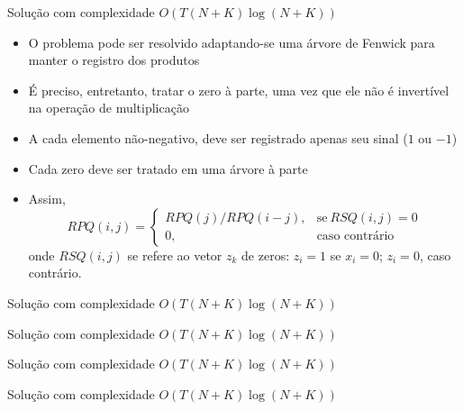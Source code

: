 \begin{frame}[fragile]{Solução com complexidade $O(T(N + K)\log(N + K))$}

    \begin{itemize}
        \item O problema pode ser resolvido adaptando-se uma árvore de Fenwick para 
            manter o registro dos produtos

        \item É preciso, entretanto, tratar o zero à parte, uma vez que ele não é invertível
            na operação de multiplicação

        \item A cada elemento não-negativo, deve ser registrado apenas seu sinal ($1$ ou $-1$)

        \item Cada zero deve ser tratado em uma árvore à parte

        \item Assim,
        \[
            RPQ(i, j) = \left\lbrace \begin{array}{ll} RPQ(j) / RPQ(i - j), & \mbox{se}\ RSQ(i, j) = 0\\
            0,& \mbox{caso contrário}\end{array} \right.
        \]
        onde $RSQ(i, j)$ se refere ao vetor $z_k$ de zeros: $z_i = 1$ se $x_i = 0$; $z_i = 0$,
        caso contrário.
 
   \end{itemize}

\end{frame}

\begin{frame}[fragile]{Solução com complexidade $O(T(N + K)\log(N + K))$}
\end{frame}

\begin{frame}[fragile]{Solução com complexidade $O(T(N + K)\log(N + K))$}
\end{frame}

\begin{frame}[fragile]{Solução com complexidade $O(T(N + K)\log(N + K))$}
\end{frame}

\begin{frame}[fragile]{Solução com complexidade $O(T(N + K)\log(N + K))$}
\end{frame}

